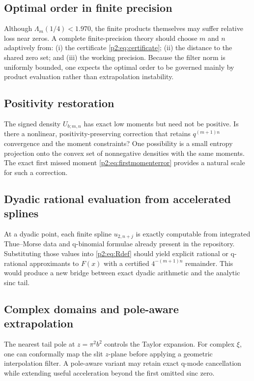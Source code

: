 \documentclass[11pt,oneside]{article}
\numberwithin{equation}{section}
\theoremstyle{definition}
\theoremstyle{remark}
\begin{document}
\subsection{Optimal order in finite precision}

Although \(\Lambda_m(1/4)<1.970\), the finite products themselves may suffer
relative loss near zeros. A complete finite-precision theory should choose
\(m\) and \(n\) adaptively from: (i) the certificate \eqref{p2:eq:certificate};
(ii) the distance to the shared zero set; and (iii) the working precision.
Because the filter norm is uniformly bounded, one expects the optimal order to be
governed mainly by product evaluation rather than extrapolation instability.

\subsection{Positivity restoration}

The signed density \(U_{b;m,n}\) has exact low moments but need not be positive.
Is there a nonlinear, positivity-preserving correction that retains
\(q^{(m+1)n}\) convergence and the moment constraints? One possibility is a
small entropy projection onto the convex set of nonnegative densities with the
same moments. The exact first missed moment \eqref{p2:eq:firstmomenterror} provides
a natural scale for such a correction.

\subsection{Dyadic rational evaluation from accelerated splines}

At a dyadic point, each finite spline \(u_{2,n+j}\) is exactly computable from
integrated Thue--Morse data and q-binomial formulae already present in the
repository. Substituting those values into \eqref{p2:eq:Rdef} should yield explicit
rational or q-rational approximants to \(F(x)\) with a certified
\(4^{-(m+1)n}\) remainder. This would produce a new bridge between exact dyadic
arithmetic and the analytic sinc tail.

\subsection{Complex domains and pole-aware extrapolation}

The nearest tail pole at \(z=\pi^2b^2\) controls the Taylor expansion. For
complex \(\xi\), one can conformally map the slit \(z\)-plane before applying a
geometric interpolation filter. A pole-aware variant may retain exact q-mode
cancellation while extending useful acceleration beyond the first omitted sinc
zero.
\end{document}
